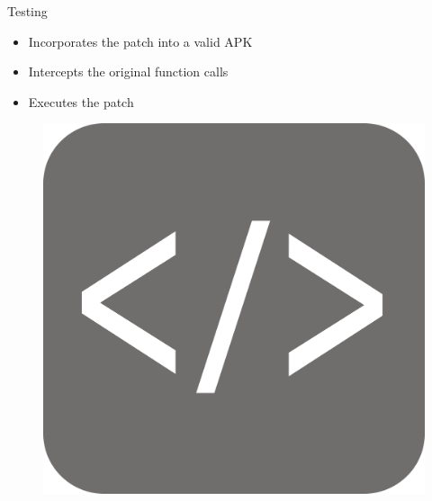 \documentclass[aspectratio=169]{beamer}
[aspectratio=169] %
\begin{document}
\begin{frame}{Testing}
  \begin{minipage}{0.49\textwidth} 
    \begin{itemize}
      \item Incorporates the patch into a valid APK
      \item Intercepts the original function calls
      \item Executes the patch
    \end{itemize}
  \end{minipage}
  \hfill
  \begin{minipage}{0.49\textwidth} 
    \begin{figure}
      \centering
      \includegraphics[height=0.5\textheight]{figures/code.png}
    \end{figure}
  \end{minipage}
\end{frame}
\end{document}
